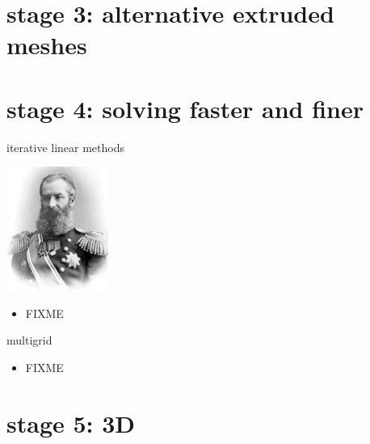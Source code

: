 \documentclass[10pt,hyperref,dvipsnames]{beamer}
\begin{document}
\section{stage 3: alternative extruded meshes}


\section{stage 4: solving faster and finer}

\begin{frame}{iterative linear methods}

\hfill \includegraphics[width=0.25\textwidth]{figs/akrylov.jpg}

\vspace{-20mm}
\begin{itemize}
\item FIXME
\end{itemize}
\end{frame}

\begin{frame}{multigrid}

\begin{itemize}
\item FIXME
\end{itemize}
\end{frame}


\section{stage 5: 3D}
\end{document}
